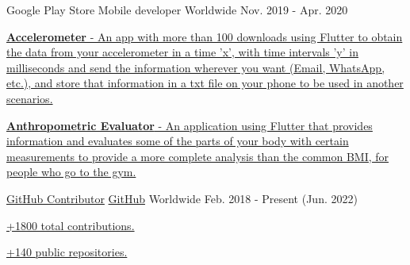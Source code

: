 \begin{cventries}
  \cventry
    {Google Play Store} %
    {Mobile developer} %
    {Worldwide} %
    {Nov. 2019 - Apr. 2020} %
    {
      \begin{cvitems} %
        \item {\href{https://play.google.com/store/apps/details?id=com.grisu.accelerometer}{
        \textbf{Accelerometer} - An app with more than 100 downloads using Flutter to obtain the data from your accelerometer
        in a time 'x', with time intervals 'y' in milliseconds and send the information wherever you
        want (Email, WhatsApp, etc.), and store that information in a txt file on your phone to be
        used in another scenarios.}}
        \item {\href{https://play.google.com/store/apps/details?id=com.grisu.anthropometric_evaluator}{
          \textbf{Anthropometric Evaluator} - An application using Flutter that provides information
          and evaluates some of the parts of your body with certain measurements to provide a more
          complete analysis than the common BMI, for people who go to the gym.}}
      \end{cvitems}
    }

  \cventry
    {\href{https://github.com/Youngermaster}{GitHub Contributor}} %
    {\href{https://github.com/Youngermaster}{GitHub}} %
    {Worldwide} %
    {Feb. 2018 - Present (Jun. 2022)} %
    {
      \begin{cvitems} %
        \item {\href{https://github.com/Youngermaster}{+1800 total contributions.}}
        \item {\href{https://github.com/Youngermaster}{+140 public repositories.}}
      \end{cvitems}
    }

\end{cventries}
